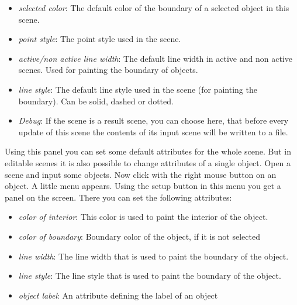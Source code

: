 \begin{itemize}
\item {\em selected color}: The default color of the boundary of a selected object in this scene.

\item {\em point style}: The point style used in the scene.
                 
\item {\em active/non active line width}: The default line width in active and non active scenes. 
                            Used for painting the boundary of objects.
                
\item {\em line style}: The default line style used in the scene (for painting the boundary). Can be solid, dashed or dotted.
            
\item {\em Debug}: If the scene is a result scene, you can choose here, that before every update
                of this scene the contents of its input scene will be written to a file.
      
\end{itemize}

Using this panel you can set some default attributes for the whole scene. But in editable scenes it is also
possible to change attributes of a single object.
Open a scene and input some objects. Now click with the right mouse button on an object. A little menu appears.
Using the setup button in this menu you get a panel on the screen.
There you can set the following attributes:

\begin{itemize}

\item {\em color of interior}: This color is used to paint the interior of the object.

\item {\em color of boundary}: Boundary color of the object, if it is not selected 

\item {\em line width}: The line width that is used to paint the boundary of the object.

\item {\em line style}: The line style that is used to paint the boundary of the object. 

\item {\em object label}: An attribute defining the label of an object 

\end{itemize}

